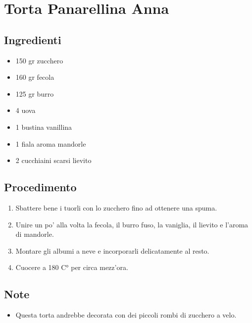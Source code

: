 \section{Torta Panarellina Anna}
\subsection{Ingredienti}
\begin{itemize}
\item 150 gr zucchero   
\item 160 gr fecola  
\item 125 gr burro  
\item 4 uova  
\item 1 bustina vanillina  
\item 1 fiala aroma mandorle  
\item 2 cucchiaini scarsi lievito
\end{itemize}
\subsection{Procedimento}
\begin{enumerate}
\item  Sbattere bene i tuorli con lo zucchero fino ad ottenere una spuma.  
\item  Unire un po' alla volta la fecola, il burro fuso, la vaniglia, il lievito e l'aroma di mandorle.  
\item  Montare gli albumi a neve e incorporarli delicatamente al resto.  
\item  Cuocere a 180 C° per circa mezz'ora.
\end{enumerate}
\subsection{Note}
\begin{itemize}
\item Questa torta andrebbe decorata con dei piccoli rombi di zucchero a velo.
\end{itemize}
